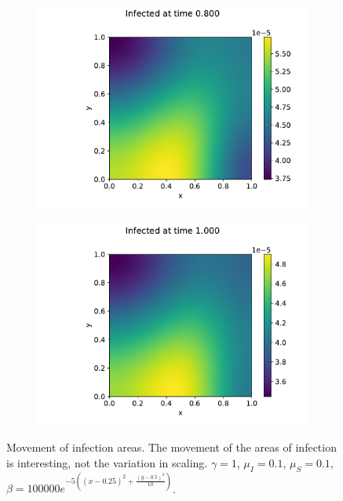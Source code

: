 \begin{figure}
\begin{subfigure}[b]{0.49\linewidth}
        \includegraphics[width=\textwidth]{report/Images/plots/plot-i_t=8000-1.pdf}
    \end{subfigure}
    \hfill
    \begin{subfigure}[b]{0.49\linewidth}
        \centering
        \includegraphics[width=\textwidth]{report/Images/plots/plot-i_t=10000-1.pdf}
    \end{subfigure}
    \caption{Movement of infection areas. The movement of the areas of infection is interesting, not the variation in scaling. $\gamma = 1$, $\mu_I = 0.1$, $\mu_S = 0.1$, $\beta = 100 000 e^{-5((x-0.25)^2 + \frac{(y-0.5)^2}{10})}$.}
    \label{fig:infected-time-evolution}
\end{figure}

